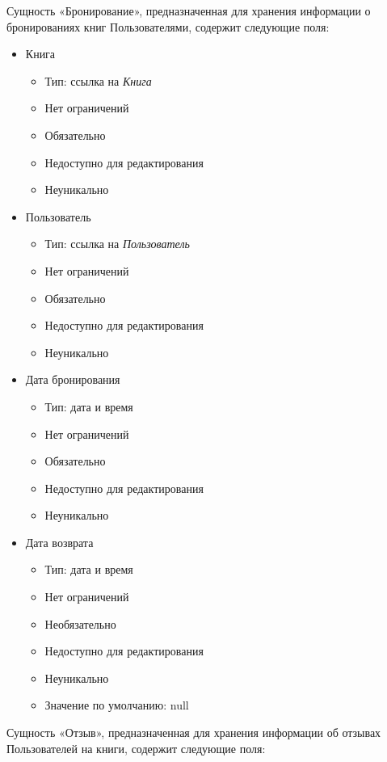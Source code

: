 \documentclass[data-specification.tex]{subfiles}
\begin{document}
\par
Сущность «Бронирование», предназначенная для хранения информации о бронированиях книг Пользователями, содержит следующие поля:
\begin{itemize}
    \item Книга
    \begin{itemize}
        \item Тип: ссылка на \textsl{Книга}
        \item Нет ограничений
        \item Обязательно
        \item Недоступно для редактирования
        \item Неуникально
    \end{itemize}
    \item Пользователь
    \begin{itemize}
        \item Тип: ссылка на \textsl{Пользователь}
        \item Нет ограничений
        \item Обязательно
        \item Недоступно для редактирования
        \item Неуникально
    \end{itemize}
    \item Дата бронирования
    \begin{itemize}
        \item Тип: дата и время
        \item Нет ограничений
        \item Обязательно
        \item Недоступно для редактирования
        \item Неуникально
    \end{itemize}
    \item Дата возврата
    \begin{itemize}
        \item Тип: дата и время
        \item Нет ограничений
        \item Необязательно
        \item Недоступно для редактирования
        \item Неуникально
        \item Значение по умолчанию: null
    \end{itemize}
\end{itemize}
\par
Сущность «Отзыв», предназначенная для хранения информации об отзывах Пользователей на книги, содержит следующие поля:
\end{document}
